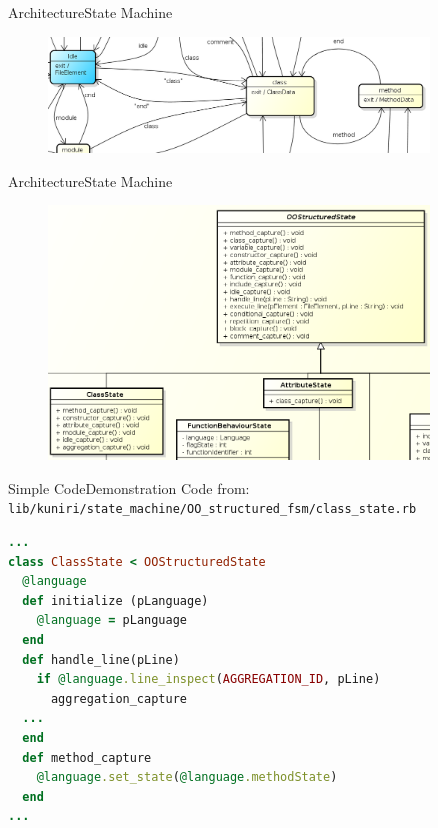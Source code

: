 \documentclass[10pt]{beamer}
\begin{document}
\begin{frame}{Architecture}{State Machine}
  \begin{figure}[Look at FSM]
    \includegraphics[width=0.9\textwidth]{images/idleToClassToMethod.png}
  \end{figure}
\end{frame}

\begin{frame}{Architecture}{State Machine}
  \begin{figure}[Look at class structure]
    \includegraphics[width=0.9\textwidth]{images/classFSM.png}
  \end{figure}
\end{frame}

\begin{frame}[fragile]{Simple Code}{Demonstration}
Code from:
\verb|lib/kuniri/state_machine/OO_structured_fsm/class_state.rb|
\small
\begin{lstlisting}[language=Ruby, caption=Class State]
...
class ClassState < OOStructuredState
  @language
  def initialize (pLanguage)
    @language = pLanguage
  end
  def handle_line(pLine)
    if @language.line_inspect(AGGREGATION_ID, pLine)
      aggregation_capture
  ...
  end
  def method_capture
    @language.set_state(@language.methodState)
  end
...
\end{lstlisting}
\end{frame}
\end{document}
